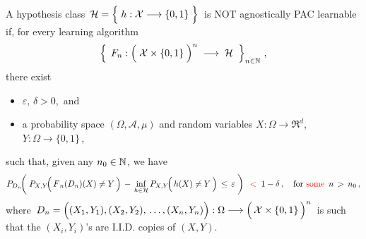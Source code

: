 \vskip 1.0cm
\begin{remark}
\mbox{}\vskip 0.1cm
\noindent
A hypothesis class
\,$\mathcal{H} = \left\{\; h : \mathcal{X} \overset{{\color{white}-}}{\longrightarrow} \{0,1\} \;\right\}$\,
is NOT agnostically PAC learnable if, for every learning algorithm
\begin{equation*}
\left\{\;\,
	F_{n} : \left(\;\mathcal{X} \overset{{\color{white}.}}{\times} \{0,1\} \;\right)^{n}
	\; \longrightarrow \;\mathcal{H}
	\;\;\right\}_{n\in\N}\,,
\end{equation*}
there exist
\begin{itemize}
\item
	$\varepsilon,\, \delta > 0$,\, and
\item
	a probability space $(\Omega,\mathcal{A},\mu)$ and
	random variables $X : \Omega \longrightarrow \Re^{d}$,
	$Y : \Omega \longrightarrow \{0,1\}$\,,
\end{itemize}
such that, given any $n_{0} \in \mathbb{N}$, we have
\begin{equation*}
P_{D_{n}}\!\!\left(\;
	P_{X,Y}\!\!\left(\,\overset{{\color{white}.}}{F}_{n}(D_{n})(X) \neq Y \,\right)
		\,-\,
		\underset{h\in\mathcal{H}}{\inf}\,P_{X,Y}\!\!\left(\,\overset{{\color{white}.}}{h}(X) \neq Y \,\right)
	\,\leq\,
		\varepsilon
	\;\right)
\;\; {\color{red}<} \;\;
	1 - \delta\,,
\quad
	\textnormal{for {\color{red}some} \,$n \,>\, n_{0}$}\,,
\end{equation*}
where
\,$D_{n} = \left((X_{1},Y_{1}),(X_{2},Y_{2}),\,\overset{{\color{white}\vert}}{\ldots}\,,(X_{n},Y_{n})\right)
	: \Omega \longrightarrow
	\left(\,\mathcal{X}\overset{{\color{white}.}}{\times}\{0,1\}\,\right)^{n}$\,
is such that the
$(X_{i},Y_{i})$'s are I.I.D. copies of $(X,Y)$.
\end{remark}


